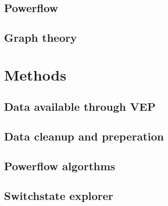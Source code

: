 \documentclass[a4paper]{report}
\begin{document}


\section{Powerflow}



\section{Graph theory}



\chapter{Methods}

\section{Data available through VEP}




\section{Data cleanup and preperation}


\section{Powerflow algorthms}


\section{Switchstate explorer}
\end{document}
